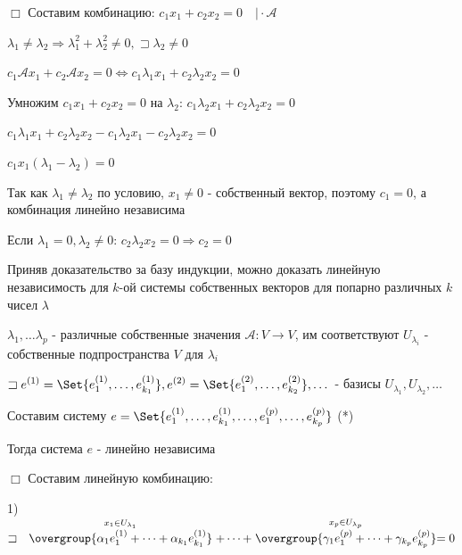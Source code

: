 \documentclass[12pt]{article}
\begin{document}
    $\Box$ Составим комбинацию: $\displaystyle c_1 x_1 + c_2 x_2 = 0 \quad \Big| \cdot \mathcal{A}$

    $\displaystyle \lambda_1 \neq \lambda_2 \Longrightarrow \lambda_1^2 + \lambda_2^2 \neq 0, \sqsupset \lambda_2 \neq 0$

    $\displaystyle c_1 \mathcal{A} x_1 + c_2 \mathcal{A} x_2 = 0 \Longleftrightarrow c_1 \lambda_1 x_1 + c_2 \lambda_2 x_2 = 0$

    Умножим $\displaystyle c_1 x_1 + c_2 x_2 = 0$ на $\displaystyle \lambda_2$: $\displaystyle c_1 \lambda_2 x_1 + c_2 \lambda_2 x_2 = 0$

    $\displaystyle c_1 \lambda_1 x_1 + c_2 \lambda_2 x_2 - c_1 \lambda_2 x_1 - c_2 \lambda_2 x_2 = 0$

    $\displaystyle c_1 x_1(\lambda_1 - \lambda_2) = 0$

    Так как $\displaystyle \lambda_1 \neq \lambda_2$ по условию, $\displaystyle x_1 \neq 0$ - собственный вектор, поэтому $\displaystyle c_1 = 0$, а комбинация линейно независима

    Если $\displaystyle \lambda_1 = 0, \lambda_2 \neq 0$: $\displaystyle c_2 \lambda_2 x_2 = 0 \Longrightarrow c_2 = 0$

    \Nota Приняв доказательство за базу индукции, можно доказать линейную независимость для $k$-ой системы собственных векторов для попарно различных $k$ чисел $\lambda$



    \Th $\displaystyle \lambda_1, \dots \lambda_p$ - различные собственные значения $\mathcal{A} : V \rightarrow V$,
    им соответствуют $\displaystyle U_{\lambda_i}$ - собственные подпространства $V$ для $\displaystyle \lambda_i$

    $\displaystyle \sqsupset e^{(1)} = \Set{e^{(1)}_1, \dots, e^{(1)}_{k_1}}, e^{(2)} = \Set{e^{(2)}_1, \dots, e^{(2)}_{k_2}}, \dots$ -
    базисы $\displaystyle U_{\lambda_1}, U_{\lambda_2}, \dots$

    Составим систему $\displaystyle e = \Set{e^{(1)}_1, \dots, e^{(1)}_{k_1}, \dots, e^{(p)}_1, \dots, e^{(p)}_{k_p}}$ (*)

    Тогда система $e$ - линейно независима

    $\Box$ Составим линейную комбинацию:

    1) $\displaystyle \sqsupset \quad \stackrel{x_1 \in U_{\lambda_1}}{\overgroup{\alpha_1 e^{(1)}_1 + \dots + \alpha_{k_1} e^{(1)}_{k_1}}} + \dots +
    \stackrel{x_p \in U_{\lambda_p}}{\overgroup{\gamma_1 e^{(p)}_1 + \dots + \gamma_{k_p} e^{(p)}_{k_p}}} = 0$
\end{document}
